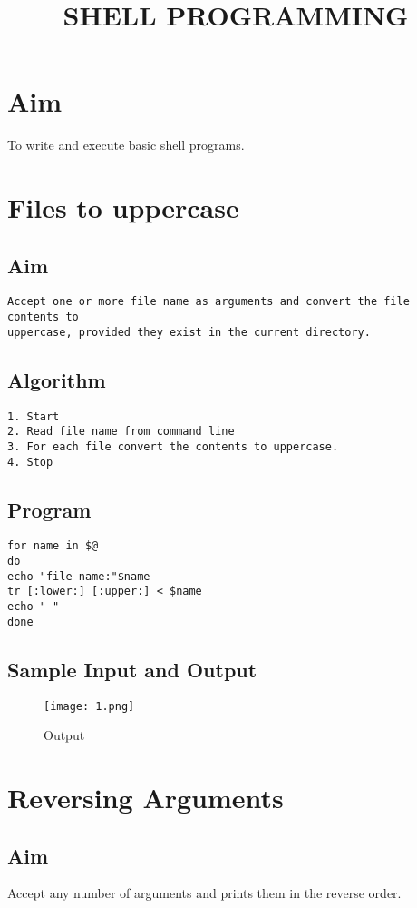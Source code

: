 \documentclass{article}
\title{\textbf {SHELL PROGRAMMING}}
\date{\vspace{-5ex}}
\begin{document}
\maketitle
\thispagestyle{first}
\section*{\Large Aim}
To write and execute basic shell programs.
\section{\Large Files to uppercase}
\subsection{Aim}
\begin{Verbatim}[tabsize = 4]
Accept one or more file name as arguments and convert the file contents to
uppercase, provided they exist in the current directory.
\end{Verbatim}
\subsection{Algorithm}
\begin{Verbatim}[tabsize = 4]
1. Start
2. Read file name from command line
3. For each file convert the contents to uppercase.
4. Stop
\end{Verbatim}
\subsection{Program}
\begin{Verbatim}[tabsize = 4]
for name in $@
do
echo "file name:"$name
tr [:lower:] [:upper:] < $name
echo " "
done
\end{Verbatim}
\pagestyle{third}
\subsection{Sample Input and Output}
\begin{figure}[H]
    \centering
    \texttt{[image: 1.png]}
    \caption{Output}
    \label{fig:my_label2}
\end{figure}
\section{\Large Reversing Arguments}
\subsection{Aim}
Accept any number of arguments and prints them in the reverse order.
\end{document}
